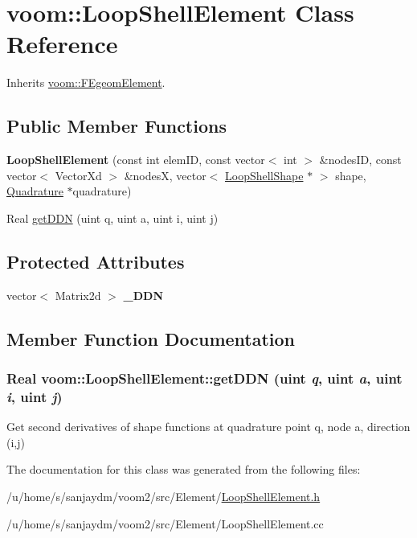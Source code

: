\hypertarget{classvoom_1_1_loop_shell_element}{
\section{voom::LoopShellElement Class Reference}
\label{classvoom_1_1_loop_shell_element}
}


Inherits \hyperlink{classvoom_1_1_f_egeom_element}{voom::FEgeomElement}.\subsection*{Public Member Functions}
\begin{DoxyCompactItemize}
\item 
\hypertarget{classvoom_1_1_loop_shell_element_a2667e0d89939913fe67a6f1befadc08d}{
{\bfseries LoopShellElement} (const int elemID, const vector$<$ int $>$ \&nodesID, const vector$<$ VectorXd $>$ \&nodesX, vector$<$ \hyperlink{classvoom_1_1_loop_shell_shape}{LoopShellShape} $\ast$ $>$ shape, \hyperlink{classvoom_1_1_quadrature}{Quadrature} $\ast$quadrature)}
\label{classvoom_1_1_loop_shell_element_a2667e0d89939913fe67a6f1befadc08d}

\item 
Real \hyperlink{classvoom_1_1_loop_shell_element_a28b4f7369be66121c16c9b1760129bbb}{getDDN} (uint q, uint a, uint i, uint j)
\end{DoxyCompactItemize}
\subsection*{Protected Attributes}
\begin{DoxyCompactItemize}
\item 
\hypertarget{classvoom_1_1_loop_shell_element_acd71f444f2c11cabb6724d2ca3c916ac}{
vector$<$ Matrix2d $>$ {\bfseries \_\-DDN}}
\label{classvoom_1_1_loop_shell_element_acd71f444f2c11cabb6724d2ca3c916ac}

\end{DoxyCompactItemize}


\subsection{Member Function Documentation}
\hypertarget{classvoom_1_1_loop_shell_element_a28b4f7369be66121c16c9b1760129bbb}{
\subsubsection[{getDDN}]{\setlength{\rightskip}{0pt plus 5cm}Real voom::LoopShellElement::getDDN (uint {\em q}, \/  uint {\em a}, \/  uint {\em i}, \/  uint {\em j})}}
\label{classvoom_1_1_loop_shell_element_a28b4f7369be66121c16c9b1760129bbb}
Get second derivatives of shape functions at quadrature point q, node a, direction (i,j) 

The documentation for this class was generated from the following files:\begin{DoxyCompactItemize}
\item 
/u/home/s/sanjaydm/voom2/src/Element/\hyperlink{_loop_shell_element_8h}{LoopShellElement.h}\item 
/u/home/s/sanjaydm/voom2/src/Element/LoopShellElement.cc\end{DoxyCompactItemize}
